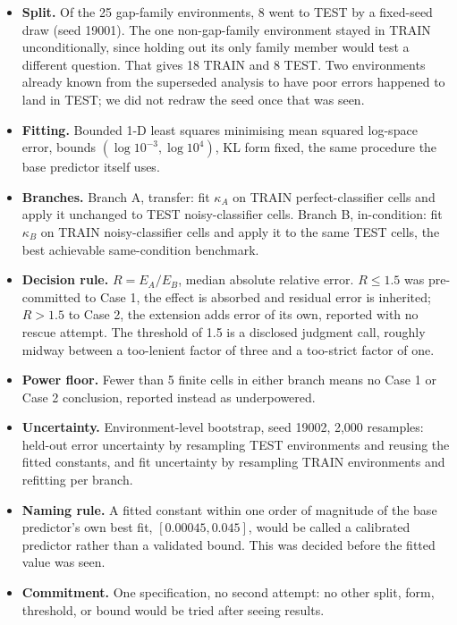 \documentclass[conference]{IEEEtran}
\begin{document}
\begin{itemize}
\setlength\itemsep{1pt}
\setlength\parskip{0pt}
\item \textbf{Split.} Of the 25 gap-family environments, 8 went to TEST by
a fixed-seed draw (seed 19001). The one non-gap-family environment stayed
in TRAIN unconditionally, since holding out its only family member would
test a different question. That gives 18 TRAIN and 8 TEST. Two
environments already known from the superseded analysis to have poor
errors happened to land in TEST; we did not redraw the seed once that was
seen.
\item \textbf{Fitting.} Bounded 1-D least squares minimising mean squared
log-space error, bounds $(\log 10^{-3}, \log 10^{4})$, KL form fixed, the
same procedure the base predictor itself uses.
\item \textbf{Branches.} Branch A, transfer: fit $\kappa_A$ on TRAIN
perfect-classifier cells and apply it unchanged to TEST noisy-classifier
cells. Branch B, in-condition: fit $\kappa_B$ on TRAIN noisy-classifier
cells and apply it to the same TEST cells, the best achievable
same-condition benchmark.
\item \textbf{Decision rule.} $R = E_A/E_B$, median absolute relative
error. $R \le 1.5$ was pre-committed to Case 1, the effect is absorbed
and residual error is inherited; $R > 1.5$ to Case 2, the extension adds
error of its own, reported with no rescue attempt. The threshold of 1.5
is a disclosed judgment call, roughly midway between a too-lenient factor
of three and a too-strict factor of one.
\item \textbf{Power floor.} Fewer than 5 finite cells in either branch
means no Case 1 or Case 2 conclusion, reported instead as underpowered.
\item \textbf{Uncertainty.} Environment-level bootstrap, seed 19002,
2{,}000 resamples: held-out error uncertainty by resampling TEST
environments and reusing the fitted constants, and fit uncertainty by
resampling TRAIN environments and refitting per branch.
\item \textbf{Naming rule.} A fitted constant within one order of
magnitude of the base predictor's own best fit, $[0.00045, 0.045]$, would
be called a calibrated predictor rather than a validated bound. This was
decided before the fitted value was seen.
\item \textbf{Commitment.} One specification, no second attempt: no other
split, form, threshold, or bound would be tried after seeing results.
\end{itemize}
\end{document}
